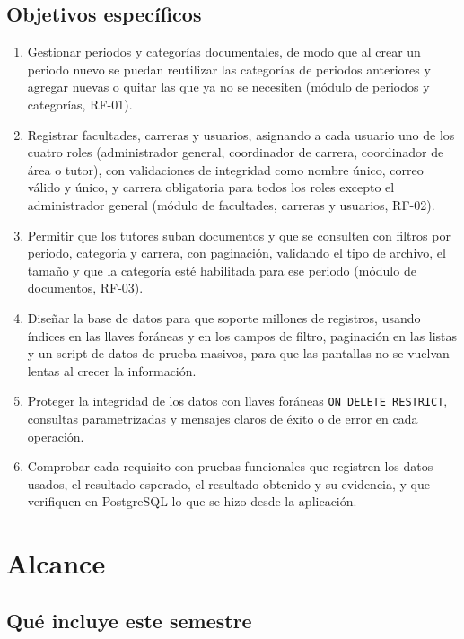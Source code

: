 \documentclass[12pt,a4paper,oneside]{article}
\begin{document}
\subsection{Objetivos específicos}

\begin{enumerate}[label=\textbf{OE\arabic*.}, leftmargin=1.6cm]
  \item Gestionar periodos y categorías documentales, de modo que al crear un periodo
        nuevo se puedan reutilizar las categorías de periodos anteriores y agregar
        nuevas o quitar las que ya no se necesiten (módulo de periodos y categorías,
        RF-01).
  \item Registrar facultades, carreras y usuarios, asignando a cada usuario uno de los
        cuatro roles (administrador general, coordinador de carrera, coordinador de área
        o tutor), con validaciones de integridad como nombre único, correo válido y
        único, y carrera obligatoria para todos los roles excepto el administrador
        general (módulo de facultades, carreras y usuarios, RF-02).
  \item Permitir que los tutores suban documentos y que se consulten con filtros por
        periodo, categoría y carrera, con paginación, validando el tipo de archivo, el
        tamaño y que la categoría esté habilitada para ese periodo (módulo de
        documentos, RF-03).
  \item Diseñar la base de datos para que soporte millones de registros, usando índices
        en las llaves foráneas y en los campos de filtro, paginación en las listas y un
        script de datos de prueba masivos, para que las pantallas no se vuelvan lentas
        al crecer la información.
  \item Proteger la integridad de los datos con llaves foráneas \texttt{ON DELETE
        RESTRICT}, consultas parametrizadas y mensajes claros de éxito o de error en
        cada operación.
  \item Comprobar cada requisito con pruebas funcionales que registren los datos
        usados, el resultado esperado, el resultado obtenido y su evidencia, y que
        verifiquen en PostgreSQL lo que se hizo desde la aplicación.
\end{enumerate}

\section{Alcance}

\subsection{Qué incluye este semestre}
\end{document}
